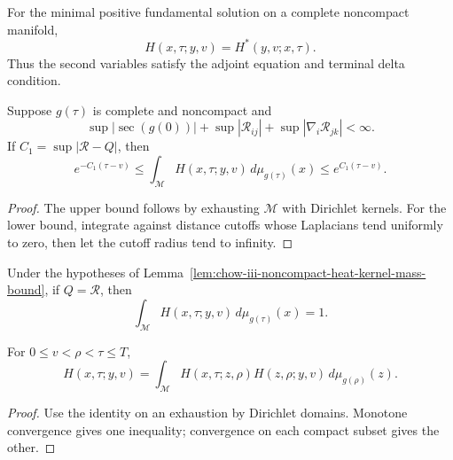 \begin{lemma}
\label{lem:chow-iii-noncompact-heat-adjoint-symmetry}
For the minimal positive fundamental solution on a complete noncompact
manifold,
\[
 H(x,\tau;y,v)=H^*(y,v;x,\tau).
\]
Thus the second variables satisfy the adjoint equation and terminal delta
condition.
\end{lemma}

\begin{lemma}
\label{lem:chow-iii-noncompact-heat-kernel-mass-bound}
Suppose \(g(\tau)\) is complete and noncompact and
\[
 \sup|\sec(g(0))|+\sup|\mathcal R_{ij}|+\sup|\nabla_i\mathcal R_{jk}|<\infty.
\]
If \(C_1=\sup|\mathcal R-Q|\), then
\[
 e^{-C_1(\tau-v)}\le\int_{\mathcal M}H(x,\tau;y,v)
 \,d\mu_{g(\tau)}(x)\le e^{C_1(\tau-v)}.
\]
\end{lemma}
\begin{proof}
\sketch The upper bound follows by exhausting \(\mathcal M\) with Dirichlet kernels.
For the lower bound, integrate against distance cutoffs whose Laplacians tend
uniformly to zero, then let the cutoff radius tend to infinity.
\end{proof}

\begin{corollary}
\label{cor:chow-iii-noncompact-heat-kernel-mass-preservation}
Under the hypotheses of Lemma~\ref{lem:chow-iii-noncompact-heat-kernel-mass-bound},
if \(Q=\mathcal R\), then
\[
 \int_{\mathcal M}H(x,\tau;y,v)\,d\mu_{g(\tau)}(x)=1.
\]
\end{corollary}

\begin{lemma}
\label{lem:chow-iii-noncompact-heat-kernel-semigroup}
For \(0\le v<\rho<\tau\le T\),
\[
 H(x,\tau;y,v)=\int_{\mathcal M}H(x,\tau;z,\rho)
 H(z,\rho;y,v)\,d\mu_{g(\rho)}(z).
\]
\end{lemma}
\begin{proof}
\sketch Use the identity on an exhaustion by Dirichlet domains.  Monotone convergence
gives one inequality; convergence on each compact subset gives the other.
\end{proof}

